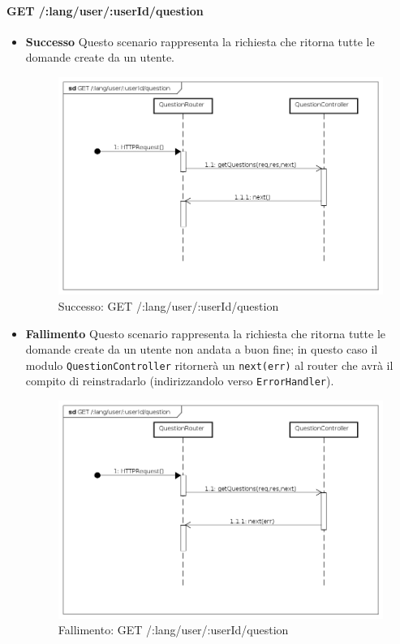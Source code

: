 
\paragraph{GET /:lang/user/:userId/question}
\begin{itemize}
\item \textbf{Successo}
Questo scenario rappresenta la richiesta che ritorna tutte le domande create da un utente.

\begin{figure}[ht]
	\centering
	\includegraphics[scale=0.45]{UML/DiagrammiDiSequenza/Back-end/GET__lang_user__userId_question_success.png}
	\caption{Successo: GET /:lang/user/:userId/question}
\end{figure}
\FloatBarrier

\item \textbf{Fallimento}
Questo scenario rappresenta la richiesta che ritorna tutte le domande create da un utente non andata a buon fine; in questo caso il modulo \texttt{QuestionController} ritornerà un \texttt{next(err)} al router che avrà il compito di reinstradarlo (indirizzandolo verso \texttt{ErrorHandler}).

\begin{figure}[ht]
	\centering
	\includegraphics[scale=0.45]{UML/DiagrammiDiSequenza/Back-end/GET__lang_user__userId_question_failure.png}
	\caption{Fallimento: GET /:lang/user/:userId/question}
\end{figure}
\FloatBarrier

\end{itemize}

